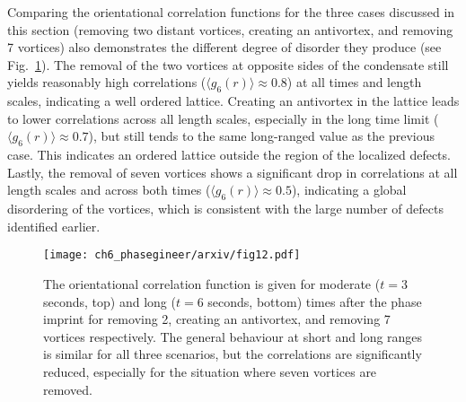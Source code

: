 Comparing the orientational correlation functions for the three cases discussed in this section (removing two distant vortices, creating an antivortex, and removing 7 vortices) also demonstrates the different degree of disorder they produce (see Fig.~\ref{fig:g6_2edge_anti_nuclear}). The removal of the two vortices at opposite sides of the condensate still yields reasonably high correlations ($\langle g_6(r) \rangle \approx 0.8$) at all times and length scales, indicating a well ordered lattice. Creating an antivortex in the lattice leads to lower correlations across all length scales, especially in the long time limit ($\langle g_6(r) \rangle\approx 0.7$), but still tends to the same long-ranged value as the previous case. This indicates an ordered lattice outside the region of the localized defects. Lastly, the removal of seven vortices shows a significant drop in correlations at all length scales and across both times ($\langle g_6(r) \rangle\approx 0.5$), indicating a global disordering of the vortices, which is consistent with the large number of defects identified earlier.

\begin{figure}\centering
    \texttt{[image: ch6\_phasegineer/arxiv/fig12.pdf]}
    \caption{The orientational correlation function is given for moderate ($t=3$ seconds, top) and long ($t=6$ seconds, bottom) times after the phase imprint for removing 2, creating an antivortex, and removing 7 vortices respectively. The general behaviour at short and long ranges is similar for all three scenarios, but the correlations are significantly reduced, especially for the situation where seven vortices are removed.}\label{fig:g6_2edge_anti_nuclear}
\end{figure}

